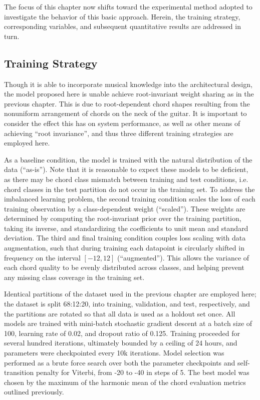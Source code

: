 The focus of this chapter now shifts toward the experimental method adopted to investigate the behavior of this basic approach.
Herein, the training strategy, corresponding variables, and subsequent quantitative results are addressed in turn.

\subsection{Training Strategy}
\label{subsec:strategy}

Though it is able to incorporate musical knowledge into the architectural design, the model proposed here is unable achieve root-invariant weight sharing as in the previous chapter.
This is due to root-dependent chord shapes resulting from the nonuniform arrangement of chords on the neck of the guitar.
It is important to consider the effect this has on system performance, as well as other means of achieving ``root invariance'', and thus three different training strategies are employed here.

As a baseline condition, the model is trained with the natural distribution of the data (``as-is'').
Note that it is reasonable to expect these models to be deficient, as there may be chord class mismatch between training and test conditions, i.e. chord classes in the test partition do not occur in the training set.
To address the imbalanced learning problem, the second training condition scales the loss of each training observation by a class-dependent weight (``scaled'').
These weights are determined by computing the root-invariant prior over the training partition, taking its inverse, and standardizing the coefficients to unit mean and standard deviation.
The third and final training condition couples loss scaling with data augmentation, such that during training each datapoint is circularly shifted in frequency on the interval $[-12, 12]$ (``augmented'').
This allows the variance of each chord quality to be evenly distributed across classes, and helping prevent any missing class coverage in the training set.

Identical partitions of the dataset used in the previous chapter are employed here; the dataset is split 68:12:20, into training, validation, and test, respectively, and the partitions are rotated so that all data is used as a holdout set once.
All models are trained with mini-batch stochastic gradient descent at a batch size of 100, learning rate of 0.02, and dropout ratio of 0.125.
Training proceeded for several hundred iterations, ultimately bounded by a ceiling of 24 hours, and parameters were checkpointed every 10k iterations.
Model selection was performed as a brute force search over both the parameter checkpoints and self-transition penalty for Viterbi, from -20 to -40 in steps of 5.
The best model was chosen by the maximum of the harmonic mean of the chord evaluation metrics outlined previously.


